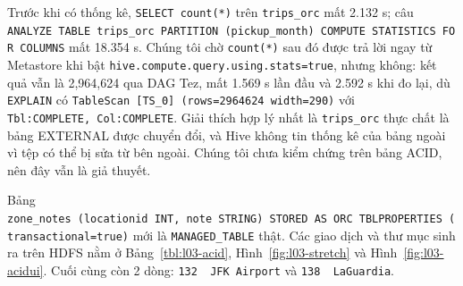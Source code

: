 \documentclass[
  12pt,
  a4paper,
]{article}
\begin{document}
Trước khi có thống kê, \texttt{SELECT\ count(*)} trên
\texttt{trips\_orc} mất 2.132 s; câu
\texttt{ANALYZE\ TABLE\ trips\_}\allowbreak{}\texttt{orc\ PARTITION\ (pickup\_}\allowbreak{}\texttt{month)\ COMPUTE\ STATISTICS\ FOR\ COLUMNS}\allowbreak{}
mất 18.354 s. Chúng tôi chờ \texttt{count(*)} sau đó được trả lời ngay
từ Metastore khi bật
\texttt{hive.}\allowbreak{}\texttt{compute.}\allowbreak{}\texttt{query.}\allowbreak{}\texttt{using.}\allowbreak{}\texttt{stats=}\allowbreak{}\texttt{true}\allowbreak{},
nhưng không: kết quả vẫn là 2,964,624 qua DAG Tez, mất 1.569 s lần đầu
và 2.592 s khi đo lại, dù \texttt{EXPLAIN} có
\texttt{TableScan\ {[}TS\_}\allowbreak{}\texttt{0{]}\ (rows=}\allowbreak{}\texttt{2964624\ width=}\allowbreak{}\texttt{290)}\allowbreak{}
với
\texttt{Tbl:}\allowbreak{}\texttt{COMPLETE,}\allowbreak{}\texttt{\ Col:}\allowbreak{}\texttt{COMPLETE}\allowbreak{}.
Giải thích hợp lý nhất là \texttt{trips\_orc} thực chất là bảng EXTERNAL
được chuyển đổi, và Hive không tin thống kê của bảng ngoài vì tệp có thể
bị sửa từ bên ngoài. Chúng tôi chưa kiểm chứng trên bảng ACID, nên đây
vẫn là giả thuyết.

Bảng
\texttt{zone\_}\allowbreak{}\texttt{notes\ (locationid\ INT,}\allowbreak{}\texttt{\ note\ STRING)\ STORED\ AS\ ORC\ TBLPROPERTIES\ (\textquotesingle{}transactional\textquotesingle{}=}\allowbreak{}\texttt{\textquotesingle{}true\textquotesingle{})}\allowbreak{}
mới là \texttt{MANAGED\_TABLE} thật. Các giao dịch và thư mục sinh ra
trên HDFS nằm ở Bảng~\ref{tbl:l03-acid}, Hình~\ref{fig:l03-stretch} và
Hình~\ref{fig:l03-acidui}. Cuối cùng còn 2 dòng:
\texttt{132\ \textbar{}\ JFK\ Airport}\allowbreak{} và
\texttt{138\ \textbar{}\ LaGuardia}.
\end{document}
